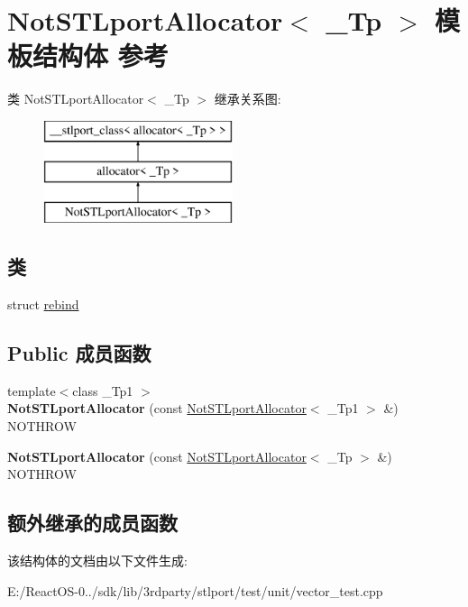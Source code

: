 \hypertarget{struct_not_s_t_lport_allocator}{}\section{Not\+S\+T\+Lport\+Allocator$<$ \+\_\+\+Tp $>$ 模板结构体 参考}
\label{struct_not_s_t_lport_allocator}
类 Not\+S\+T\+Lport\+Allocator$<$ \+\_\+\+Tp $>$ 继承关系图\+:\begin{figure}[H]
\begin{center}
\leavevmode
\includegraphics[height=3.000000cm]{struct_not_s_t_lport_allocator}
\end{center}
\end{figure}
\subsection*{类}
\begin{DoxyCompactItemize}
\item 
struct \hyperlink{struct_not_s_t_lport_allocator_1_1rebind}{rebind}
\end{DoxyCompactItemize}
\subsection*{Public 成员函数}
\begin{DoxyCompactItemize}
\item 
\mbox{\label{struct_not_s_t_lport_allocator_a2c92a423b96aca5d5eb5cf813ef45792}} 
{\footnotesize template$<$class \+\_\+\+Tp1 $>$ }\\{\bfseries Not\+S\+T\+Lport\+Allocator} (const \hyperlink{struct_not_s_t_lport_allocator}{Not\+S\+T\+Lport\+Allocator}$<$ \+\_\+\+Tp1 $>$ \&) N\+O\+T\+H\+R\+OW
\item 
\mbox{\label{struct_not_s_t_lport_allocator_af2043e2fa6873203970c076082db83ce}} 
{\bfseries Not\+S\+T\+Lport\+Allocator} (const \hyperlink{struct_not_s_t_lport_allocator}{Not\+S\+T\+Lport\+Allocator}$<$ \+\_\+\+Tp $>$ \&) N\+O\+T\+H\+R\+OW
\end{DoxyCompactItemize}
\subsection*{额外继承的成员函数}


该结构体的文档由以下文件生成\+:\begin{DoxyCompactItemize}
\item 
E\+:/\+React\+O\+S-\/0../sdk/lib/3rdparty/stlport/test/unit/vector\+\_\+test.\+cpp\end{DoxyCompactItemize}
